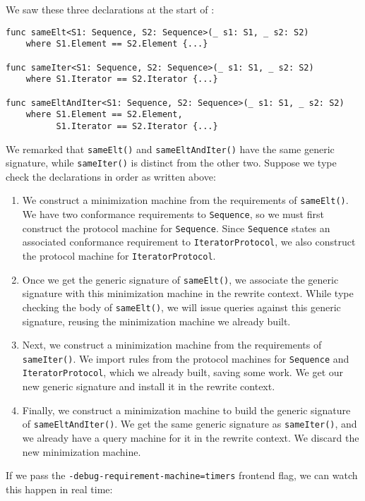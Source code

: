 \documentclass[../generics]{subfiles}
\begin{document}
\begin{example}
We saw these three declarations at the start of :
\begin{Verbatim}
func sameElt<S1: Sequence, S2: Sequence>(_ s1: S1, _ s2: S2)
    where S1.Element == S2.Element {...}

func sameIter<S1: Sequence, S2: Sequence>(_ s1: S1, _ s2: S2)
    where S1.Iterator == S2.Iterator {...}

func sameEltAndIter<S1: Sequence, S2: Sequence>(_ s1: S1, _ s2: S2)
    where S1.Element == S2.Element,
          S1.Iterator == S2.Iterator {...}
\end{Verbatim}
We remarked that \texttt{sameElt()} and \texttt{sameEltAndIter()} have the same generic signature, while \texttt{sameIter()} is distinct from the other two. Suppose we type check the declarations in order as written above:
\begin{enumerate}
\item We construct a minimization machine from the requirements of \texttt{sameElt()}. We have two conformance requirements to \texttt{Sequence}, so we must first construct the protocol machine for \texttt{Sequence}. Since \texttt{Sequence} states an associated conformance requirement to \texttt{IteratorProtocol}, we also construct the protocol machine for \texttt{IteratorProtocol}.
\item Once we get the generic signature of \texttt{sameElt()}, we associate the generic signature with this minimization machine in the rewrite context. While type checking the body of \texttt{sameElt()}, we will issue queries against this generic signature, reusing the minimization machine we already built.
\item Next, we construct a minimization machine from the requirements of \texttt{sameIter()}. We import rules from the protocol machines for \texttt{Sequence} and \texttt{IteratorProtocol}, which we already built, saving some work. We get our new generic signature and install it in the rewrite context.
\item Finally, we construct a minimization machine to build the generic signature of \texttt{sameEltAndIter()}. We get the same generic signature as \texttt{sameIter()}, and we already have a query machine for it in the rewrite context. We discard the new minimization machine.
\end{enumerate}
If we pass the \texttt{-debug-requirement-machine=timers} frontend flag, we can watch this happen in real time:
\begin{Verbatim}[fontsize=\footnotesize,numbers=none]

\end{Verbatim}
\end{example}
\end{document}
